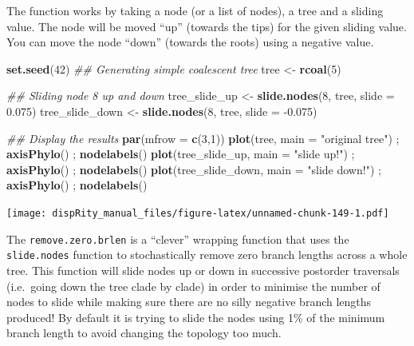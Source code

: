 \documentclass[]{book}
\newenvironment{Shaded}{\begin{snugshade}}{\end{snugshade}}
\newcommand{\CommentTok}[1]{\textcolor[rgb]{0.56,0.35,0.01}{\textit{#1}}}
\newcommand{\DataTypeTok}[1]{\textcolor[rgb]{0.13,0.29,0.53}{#1}}
\newcommand{\DecValTok}[1]{\textcolor[rgb]{0.00,0.00,0.81}{#1}}
\newcommand{\FloatTok}[1]{\textcolor[rgb]{0.00,0.00,0.81}{#1}}
\newcommand{\KeywordTok}[1]{\textcolor[rgb]{0.13,0.29,0.53}{\textbf{#1}}}
\newcommand{\NormalTok}[1]{#1}
\newcommand{\StringTok}[1]{\textcolor[rgb]{0.31,0.60,0.02}{#1}}
\begin{document}
The function works by taking a node (or a list of nodes), a tree and a sliding value.
The node will be moved ``up'' (towards the tips) for the given sliding value.
You can move the node ``down'' (towards the roots) using a negative value.

\begin{Shaded}
\begin{Highlighting}[]
\KeywordTok{set.seed}\NormalTok{(}\DecValTok{42}\NormalTok{)}
\CommentTok{## Generating simple coalescent tree}
\NormalTok{tree <-}\StringTok{ }\KeywordTok{rcoal}\NormalTok{(}\DecValTok{5}\NormalTok{)}

\CommentTok{## Sliding node 8 up and down}
\NormalTok{tree_slide_up <-}\StringTok{ }\KeywordTok{slide.nodes}\NormalTok{(}\DecValTok{8}\NormalTok{, tree, }\DataTypeTok{slide =} \FloatTok{0.075}\NormalTok{)}
\NormalTok{tree_slide_down <-}\StringTok{ }\KeywordTok{slide.nodes}\NormalTok{(}\DecValTok{8}\NormalTok{, tree, }\DataTypeTok{slide =} \FloatTok{-0.075}\NormalTok{)}

\CommentTok{## Display the results}
\KeywordTok{par}\NormalTok{(}\DataTypeTok{mfrow =} \KeywordTok{c}\NormalTok{(}\DecValTok{3}\NormalTok{,}\DecValTok{1}\NormalTok{))}
\KeywordTok{plot}\NormalTok{(tree, }\DataTypeTok{main =} \StringTok{"original tree"}\NormalTok{) ; }\KeywordTok{axisPhylo}\NormalTok{() ; }\KeywordTok{nodelabels}\NormalTok{()}
\KeywordTok{plot}\NormalTok{(tree_slide_up, }\DataTypeTok{main =} \StringTok{"slide up!"}\NormalTok{) ; }\KeywordTok{axisPhylo}\NormalTok{() ; }\KeywordTok{nodelabels}\NormalTok{()}
\KeywordTok{plot}\NormalTok{(tree_slide_down, }\DataTypeTok{main =} \StringTok{"slide down!"}\NormalTok{) ; }\KeywordTok{axisPhylo}\NormalTok{() ; }\KeywordTok{nodelabels}\NormalTok{()}
\end{Highlighting}
\end{Shaded}

\texttt{[image: dispRity\_manual\_files/figure-latex/unnamed-chunk-149-1.pdf]}

The \texttt{remove.zero.brlen} is a ``clever'' wrapping function that uses the \texttt{slide.nodes} function to stochastically remove zero branch lengths across a whole tree.
This function will slide nodes up or down in successive postorder traversals (i.e.~going down the tree clade by clade) in order to minimise the number of nodes to slide while making sure there are no silly negative branch lengths produced!
By default it is trying to slide the nodes using 1\% of the minimum branch length to avoid changing the topology too much.
\end{document}
